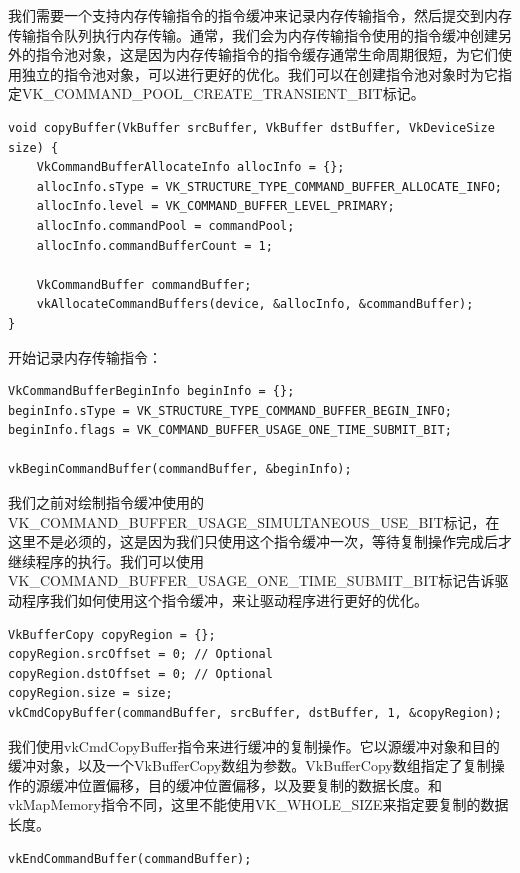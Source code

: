 \documentclass{ctexart}
\begin{document}
我们需要一个支持内存传输指令的指令缓冲来记录内存传输指令，然后提交到内存传输指令队列执行内存传输。通常，我们会为内存传输指令使用的指令缓冲创建另外的指令池对象，这是因为内存传输指令的指令缓存通常生命周期很短，为它们使用独立的指令池对象，可以进行更好的优化。我们可以在创建指令池对象时为它指定VK\_COMMAND\_POOL\_CREATE\_TRANSIENT\_BIT标记。

\begin{lstlisting}[language={[ANSI]C}]
void copyBuffer(VkBuffer srcBuffer, VkBuffer dstBuffer, VkDeviceSize size) {
	VkCommandBufferAllocateInfo allocInfo = {};
	allocInfo.sType = VK_STRUCTURE_TYPE_COMMAND_BUFFER_ALLOCATE_INFO;
	allocInfo.level = VK_COMMAND_BUFFER_LEVEL_PRIMARY;
	allocInfo.commandPool = commandPool;
	allocInfo.commandBufferCount = 1;

	VkCommandBuffer commandBuffer;
	vkAllocateCommandBuffers(device, &allocInfo, &commandBuffer);
}
\end{lstlisting}

开始记录内存传输指令：

\begin{lstlisting}[language={[ANSI]C}]
VkCommandBufferBeginInfo beginInfo = {};
beginInfo.sType = VK_STRUCTURE_TYPE_COMMAND_BUFFER_BEGIN_INFO;
beginInfo.flags = VK_COMMAND_BUFFER_USAGE_ONE_TIME_SUBMIT_BIT;

vkBeginCommandBuffer(commandBuffer, &beginInfo);
\end{lstlisting}

我们之前对绘制指令缓冲使用的VK\_COMMAND\_BUFFER\_USAGE\_SIMULTANEOUS\_USE\_BIT标记，在这里不是必须的，这是因为我们只使用这个指令缓冲一次，等待复制操作完成后才继续程序的执行。我们可以使用VK\_COMMAND\_BUFFER\_USAGE\_ONE\_TIME\_SUBMIT\_BIT标记告诉驱动程序我们如何使用这个指令缓冲，来让驱动程序进行更好的优化。

\begin{lstlisting}[language={[ANSI]C}]
VkBufferCopy copyRegion = {};
copyRegion.srcOffset = 0; // Optional
copyRegion.dstOffset = 0; // Optional
copyRegion.size = size;
vkCmdCopyBuffer(commandBuffer, srcBuffer, dstBuffer, 1, &copyRegion);
\end{lstlisting}

我们使用vkCmdCopyBuffer指令来进行缓冲的复制操作。它以源缓冲对象和目的缓冲对象，以及一个VkBufferCopy数组为参数。VkBufferCopy数组指定了复制操作的源缓冲位置偏移，目的缓冲位置偏移，以及要复制的数据长度。和vkMapMemory指令不同，这里不能使用VK\_WHOLE\_SIZE来指定要复制的数据长度。

\begin{lstlisting}[language={[ANSI]C}]
vkEndCommandBuffer(commandBuffer);
\end{lstlisting}
\end{document}
